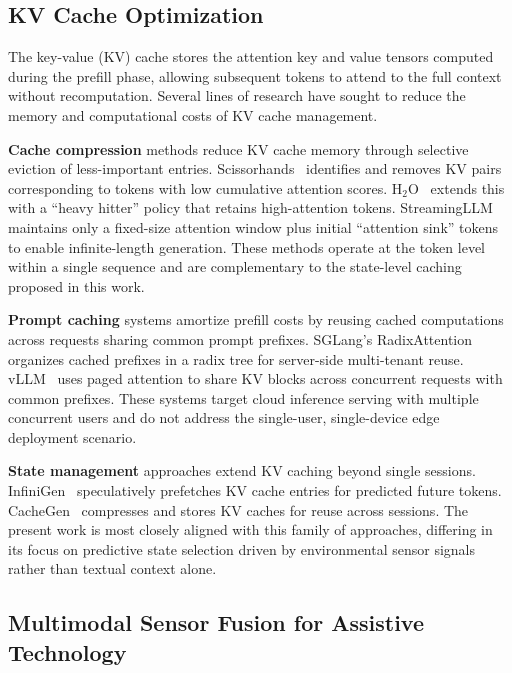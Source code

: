 \subsection{KV Cache Optimization}
\label{sec:related_kvcache}

The key-value (KV) cache stores the attention key and value tensors computed during the prefill phase, allowing subsequent tokens to attend to the full context without recomputation. Several lines of research have sought to reduce the memory and computational costs of KV cache management.

\textbf{Cache compression} methods reduce KV cache memory through selective eviction of less-important entries. Scissorhands~\cite{scissorhands} identifies and removes KV pairs corresponding to tokens with low cumulative attention scores. H$_2$O~\cite{h2o} extends this with a ``heavy hitter'' policy that retains high-attention tokens. StreamingLLM~\cite{streamingllm} maintains only a fixed-size attention window plus initial ``attention sink'' tokens to enable infinite-length generation. These methods operate at the token level within a single sequence and are complementary to the state-level caching proposed in this work.

\textbf{Prompt caching} systems amortize prefill costs by reusing cached computations across requests sharing common prompt prefixes. SGLang's RadixAttention~\cite{sglang} organizes cached prefixes in a radix tree for server-side multi-tenant reuse. vLLM~\cite{vllm} uses paged attention to share KV blocks across concurrent requests with common prefixes. These systems target cloud inference serving with multiple concurrent users and do not address the single-user, single-device edge deployment scenario.

\textbf{State management} approaches extend KV caching beyond single sessions. InfiniGen~\cite{infinigen} speculatively prefetches KV cache entries for predicted future tokens. CacheGen~\cite{cachegen} compresses and stores KV caches for reuse across sessions. The present work is most closely aligned with this family of approaches, differing in its focus on predictive state selection driven by environmental sensor signals rather than textual context alone.

\subsection{Multimodal Sensor Fusion for Assistive Technology}
\label{sec:related_fusion}

